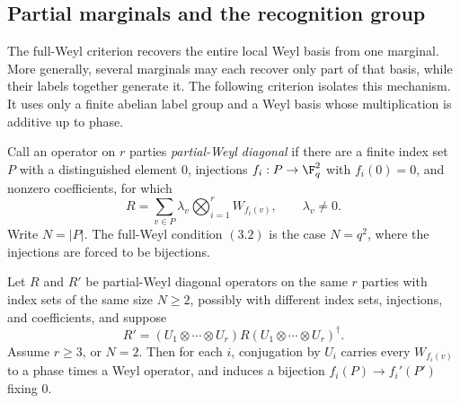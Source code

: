 \subsection{Partial marginals and the recognition group}
\label{subsec:recognition}

The full-Weyl criterion recovers the entire local Weyl basis from one
marginal.  More generally, several marginals may each recover only part of
that basis, while their labels together generate it.  The following
criterion isolates this mechanism.  It uses only a finite abelian label
group and a Weyl basis whose multiplication is additive up to phase.

Call an operator on \(r\) parties \emph{partial-Weyl diagonal} if there are
a finite index set \(P\) with a distinguished element \(0\), injections
\(f_i:P\to\F_q^2\) with \(f_i(0)=0\), and nonzero coefficients, for which
\[
 R=\sum_{v\in P}\lambda_v\bigotimes_{i=1}^{r}W_{f_i(v)},
 \qquad \lambda_v\ne0.
\]
Write \(N=|P|\).  The full-Weyl condition \((3.2)\) is the case
\(N=q^2\), where the injections are forced to be bijections.

\begin{proposition}
\label{prop:partial-weyl-marginal}
Let \(R\) and \(R'\) be partial-Weyl diagonal operators on the same
\(r\) parties with index sets of the same size \(N\geq2\), possibly with
different index sets, injections, and coefficients, and suppose
\[
 R'=(U_1\otimes\cdots\otimes U_r)R(U_1\otimes\cdots\otimes U_r)^\dagger .
\]
Assume \(r\geq3\), or \(N=2\).  Then for each \(i\), conjugation by
\(U_i\) carries every \(W_{f_i(v)}\) to a phase times a Weyl operator, and
induces a bijection \(f_i(P)\to f_i'(P')\) fixing \(0\).
\end{proposition}

